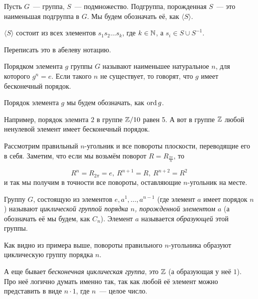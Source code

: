 	\begin{definition} 
		Пусть $G$~--- группа, $S$~--- подмножество. Подгруппа, порожденная $S$~--- это наименьшая подгруппа в $G$. Мы будем обозначать её, как $\langle S \rangle$. 
	\end{definition}

	\begin{statement} 
		$\langle S \rangle$ состоит из всех элементов $s_1 s_2 \ldots s_k$, где $k \in \mathbb{N}$, а $s _i \in S \cup S^{-1}$. 
	\end{statement}

	\begin{remark}
		Переписать это в абелеву нотацию. 
	\end{remark}

	\begin{definition} 
		Порядком элемента $g$ группы $G$ называют наименьшее натуральное $n$, для которого $g^n = e$. Если такого $n$ не существует, то говорят, что $g$ имеет бесконечный порядок. 

		Порядок элемента $g$ мы будем обозначать, как $\operatorname{ord}{g}$.
	\end{definition}

	\begin{example}
		Например, порядок элемнта $2$ в группе $\mathbb{Z}/10$ равен 5. А вот в группе $\mathbb{Z}$ любой ненулевой элемент имеет бесконечный порядок. 
	\end{example} 

	\begin{example}
		Рассмотрим правильный $n$-угольник и все повороты плоскости, переводящие его в себя. Заметим, что если мы возьмём поворот $R = R_{\frac{2\pi}{n}}$, то 

		\[
			R^n = R_{2\pi} = e,\  R^{n + 1} = R, \ R^{n + 2} = R^2 
		\]
		и так мы получим в точности все повороты, оставляющие $n$-угольник на месте. 
	\end{example}

	\begin{definition} 
		Группу $G$, состоящую из элементов $e, a^1, \ldots, a^{n - 1}$ (где элемент $a$ имеет порядок $n$) называют \emph{циклической группой порядка $n$, порожденной элементом $a$} (а обозначать её мы будем, как $C_n$). Элемент $a$ называется \emph{образующей} этой группы. 
	\end{definition}

	Как видно из примера выше, повороты правильного $n$-угольника образуют циклическую группу порядка $n$.

	\begin{remark}
		А еще бывает \emph{бесконечная циклическая группа}, это $\mathbb{Z}$ (а образующая у неё $1$). Про неё логично думать именно так, так как любой её элемент можно представить в виде $n \cdot 1$, где $n$~--- целое число.
	\end{remark}

